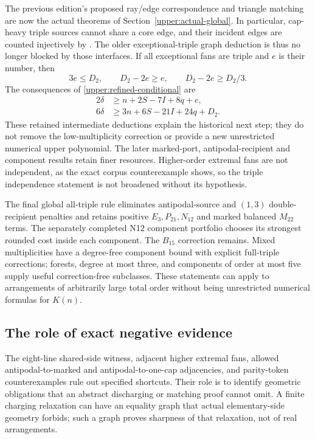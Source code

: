 The previous edition's proposed ray/edge correspondence and triangle
matching are now the actual theorems of
Section~\ref{upper:actual-global}. In particular, cap-heavy triple
sources cannot share a core edge, and their incident edges are counted
injectively by
.
The older exceptional-triple graph deduction is thus no longer blocked
by those interfaces. If all exceptional fans are triple and $e$ is their
number, then
\begin{equation}
 3e\le D_2,\qquad D_2-2e\ge e,\qquad D_2-2e\ge D_2/3.
 \label{discussion:conditional-graph}
\end{equation}
The consequences of \eqref{upper:refined-conditional} are
\begin{align}
 2\delta&\ge n+2S-7I+8q+e,\\
 6\delta&\ge3n+6S-21I+24q+D_2.
 \label{discussion:conditional-defect}
\end{align}
These retained intermediate deductions explain the historical next step;
they do not remove the low-multiplicity correction or provide a new
unrestricted numerical upper polynomial. The later marked-port,
antipodal-recipient and component results retain finer resources.
Higher-order extremal fans are not independent, as the exact corpus
counterexample shows, so the triple independence statement is not
broadened without its hypothesis.

The final global all-triple rule eliminates antipodal-source and
$(1,3)$ double-recipient penalties and retains positive $E_3,P_{21},N_{12}$
and marked balanced $M_{22}$ terms. The separately completed N12
component portfolio chooses its strongest rounded cost inside each
component. The $B_{15}$ correction remains. Mixed multiplicities have
a degree-free component bound with explicit full-triple corrections;
forests, degree at most three, and components of order at most five
supply useful correction-free subclasses. These statements can apply
to arrangements of arbitrarily large total order without being
unrestricted numerical formulas for $K(n)$.

\subsection{The role of exact negative evidence}

The eight-line shared-side witness, adjacent higher extremal fans,
allowed antipodal-to-marked and antipodal-to-one-cap adjacencies,
and parity-token counterexamples rule out specified shortcuts. Their
role is to identify geometric obligations that an abstract discharging
or matching proof cannot omit. A finite charging relaxation can have
an equality graph that actual elementary-side geometry forbids; such
a graph proves sharpness of that relaxation, not of real arrangements.

